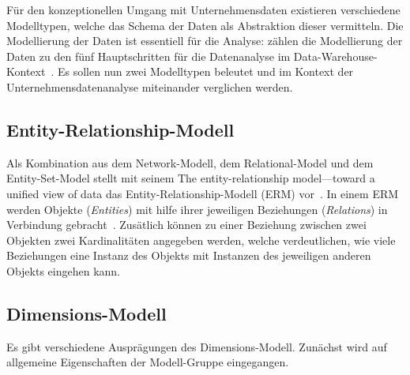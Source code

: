 \documentclass[
  language=german, %
  type=bachelor%
]{isthesis}
\begin{document}
\begin{content}
  Für den konzeptionellen Umgang mit Unternehmensdaten existieren verschiedene
  Modelltypen, welche das Schema der Daten als Abstraktion dieser vermitteln.
  Die Modellierung der Daten ist essentiell für die Analyse:
  \textsc{\citeauthor{phipps2002automating}} zählen die Modellierung der Daten
  zu den fünf Hauptschritten für die Datenanalyse im
  Data-Warehouse-Kontext~\cite[][S. 1]{phipps2002automating}. Es sollen nun
  zwei Modelltypen beleutet und im Kontext der Unternehmensdatenanalyse
  miteinander verglichen werden.

  \subsection{Entity-Relationship-Modell}
  Als Kombination aus dem
  Network-Modell, dem Relational-Model und dem Entity-Set-Model stellt
  \citeauthor{chen1976entity} \citeyear{chen1976entity} mit seinem
   \glqq{}The entity-relationship
  model—toward a unified view of data\grqq{} das Entity-Relationship-Modell
  (ERM) vor~\cite[][S. 2]{chen1976entity}. In einem \acrshort{ERM} werden Objekte
  (\textit{Entities}) mit hilfe ihrer jeweiligen Beziehungen
  (\textit{Relations}) in Verbindung gebracht~\cite[][S. 10]{chen1976entity}.
  Zusätlich können zu einer Beziehung zwischen zwei Objekten zwei Kardinalitäten
  angegeben werden, welche verdeutlichen, wie viele Beziehungen eine Instanz des
  Objekts mit Instanzen des jeweiligen anderen Objekts eingehen kann\cite[][S.
  38]{ballard1998data}.

  \begin{figure}[caption={Beispiel eines \acrlong{ERM}}, label={fig:img01}]
  \end{figure}


  \subsection{Dimensions-Modell}
  Es gibt verschiedene Ausprägungen des Dimensions-Modell. Zunächst wird auf
  allgemeine Eigenschaften der Modell-Gruppe eingegangen.


\end{content}
\end{document}
